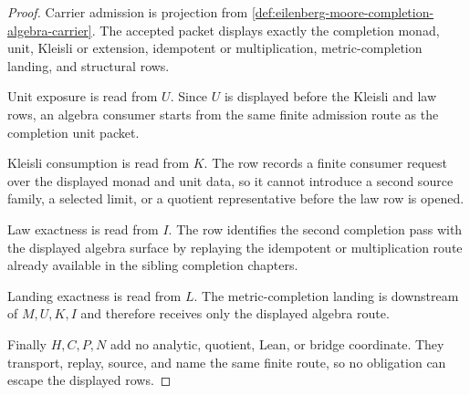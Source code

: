 \begin{proof}
Carrier admission is projection from \autoref{def:eilenberg-moore-completion-algebra-carrier}. The accepted packet displays exactly the completion monad, unit, Kleisli or extension, idempotent or multiplication, metric-completion landing, and structural rows.

Unit exposure is read from $U$. Since $U$ is displayed before the Kleisli and law rows, an algebra consumer starts from the same finite admission route as the completion unit packet.

Kleisli consumption is read from $K$. The row records a finite consumer request over the displayed monad and unit data, so it cannot introduce a second source family, a selected limit, or a quotient representative before the law row is opened.

Law exactness is read from $I$. The row identifies the second completion pass with the displayed algebra surface by replaying the idempotent or multiplication route already available in the sibling completion chapters.

Landing exactness is read from $L$. The metric-completion landing is downstream of $M,U,K,I$ and therefore receives only the displayed algebra route.

Finally $H,C,P,N$ add no analytic, quotient, Lean, or bridge coordinate. They transport, replay, source, and name the same finite route, so no obligation can escape the displayed rows.
\end{proof}


